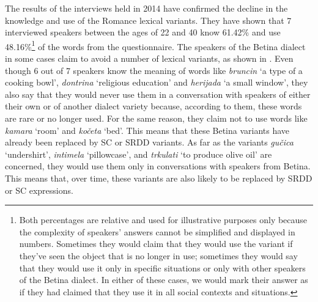 \documentclass[output=paper]{LSP/langsci}
\begin{document}
The results of the interviews held in 2014 have confirmed the decline in the knowledge and use of the Romance lexical variants. They have shown that 7 interviewed speakers between the ages of 22 and 40 know 61.42\% and use 48.16\%\footnote{Both percentages are relative and used for illustrative purposes only because the complexity of speakers’ answers cannot be simplified and displayed in numbers. Sometimes they would claim that they would use the variant if they’ve seen the object that is no longer in use; sometimes they would say that they would use it only in specific situations or only with other speakers of the Betina dialect. In either of these cases, we would mark their answer as if they had claimed that they use it in all social contexts and situations.} of the words from the questionnaire. The speakers of the Betina dialect in some cases claim to avoid a number of lexical variants, as shown in . Even though 6 out of 7 speakers know the meaning of words like \textit{bruncin} `a type of a cooking bowl', \textit{dontrina} ‘religious education’ and \textit{herijada} ‘a small window’, they also say that they would never use them in a conversation with speakers of either their own or of another dialect variety because, according to them, these words are rare or no longer used. For the same reason, they claim not to use words like \textit{kamara} `room' and \textit{kočeta} `bed'. This means that these Betina variants have already been replaced by SC or SRDD variants. As far as the variants \textit{gučica} ‘undershirt’, \textit{intimela} `pillowcase', and \textit{trkulati} ‘to produce olive oil’ are concerned, they would use them only in conversations with speakers from Betina. This means that, over time, these variants are also likely to be replaced by SRDD or SC expressions. 
\end{document}
